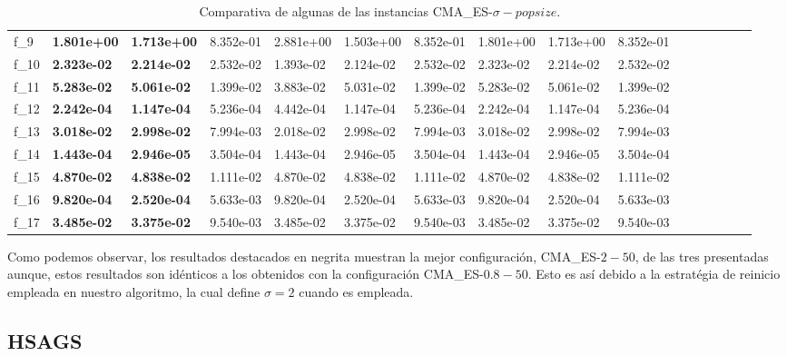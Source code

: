 \begin{table}[!ht]
{\begin{tabular}{LLLLLLLLLLLLLLLL}
f_{9} & {\bf 1.801e+00} & {\bf 1.713e+00} & 8.352e-01 & 2.881e+00 & 1.503e+00 & 8.352e-01 & 1.801e+00 & 1.713e+00 & 8.352e-01 \\
f_{10} & {\bf 2.323e-02} & {\bf 2.214e-02} & 2.532e-02 & 1.393e-02 & 2.124e-02 & 2.532e-02 & 2.323e-02 & 2.214e-02 & 2.532e-02 \\
f_{11} & {\bf 5.283e-02} & {\bf 5.061e-02} & 1.399e-02 & 3.883e-02 & 5.031e-02 & 1.399e-02 & 5.283e-02 & 5.061e-02 & 1.399e-02 \\
f_{12} & {\bf 2.242e-04} & {\bf 1.147e-04} & 5.236e-04 & 4.442e-04 & 1.147e-04 & 5.236e-04 & 2.242e-04 & 1.147e-04 & 5.236e-04 \\
f_{13} & {\bf 3.018e-02} & {\bf 2.998e-02} & 7.994e-03 & 2.018e-02 & 2.998e-02 & 7.994e-03 & 3.018e-02 & 2.998e-02 & 7.994e-03 \\
f_{14} & {\bf 1.443e-04} & {\bf 2.946e-05} & 3.504e-04 & 1.443e-04 & 2.946e-05 & 3.504e-04 & 1.443e-04 & 2.946e-05 & 3.504e-04 \\
f_{15} & {\bf 4.870e-02} & {\bf 4.838e-02} & 1.111e-02 & 4.870e-02 & 4.838e-02 & 1.111e-02 & 4.870e-02 & 4.838e-02 & 1.111e-02 \\
f_{16} & {\bf 9.820e-04} & {\bf 2.520e-04} & 5.633e-03 & 9.820e-04 & 2.520e-04 & 5.633e-03 & 9.820e-04 & 2.520e-04 & 5.633e-03 \\
f_{17} & {\bf 3.485e-02} & {\bf 3.375e-02} & 9.540e-03 & 3.485e-02 & 3.375e-02 & 9.540e-03 & 3.485e-02 & 3.375e-02 & 9.540e-03 \\
    \bottomrule
    \end{tabular}}
    \captionsetup{justification=centering}
    \caption{Comparativa de algunas de las instancias CMA\_ES-$\sigma-popsize$.}    
\end{table}

Como podemos observar, los resultados destacados en negrita muestran la mejor configuración, CMA\_ES-$2-50$, de las tres presentadas aunque, estos resultados son idénticos a los obtenidos con la configuración CMA\_ES-$0.8-50$. Esto es así debido a la estratégia de reinicio empleada en nuestro algoritmo, la cual define $\sigma = 2$ cuando es empleada.

\newpage

\subsection{HSAGS}\label{sec:paramSA}

